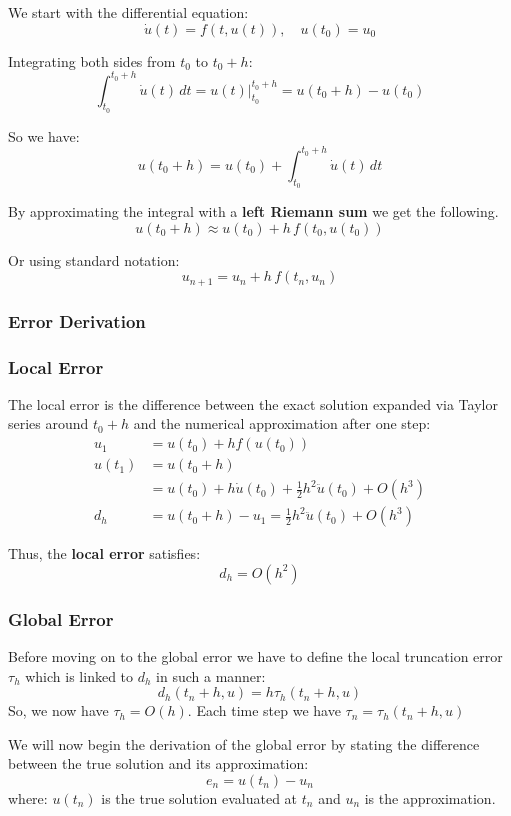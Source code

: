 \documentclass[11pt]{article}
\begin{document}
We start with the differential equation:
\[
\dot{u}(t) = f(t,u(t)) , \quad u(t_0) = u_0
\]

Integrating both sides from \( t_0 \) to \( t_0 + h \):
\[
\int_{t_0}^{t_0 + h} \dot{u}(t)\,dt = u(t) \bigg|_{t_0}^{t_0 + h} = u(t_0 + h) - u(t_0)
\]

So we have:
\[
u(t_0 + h) = u(t_0) + \int_{t_0}^{t_0 + h} \dot{u}(t)\,dt
\]

By approximating the integral with a \textbf{left Riemann sum} we get the following.
\[
u(t_0 + h) \approx u(t_0) + h\,f(t_0, u(t_0))
\]

Or using standard notation:
\[
u_{n+1} = u_n + h\,f(t_n,u_n)
\]

\subsubsection{Error Derivation}

\subsubsection*{Local Error}

The local error is the difference between the exact solution expanded via Taylor series around \( t_0 + h \) and the numerical approximation after one step:
\begin{align*}
u_1 &= u(t_0) + h f(u(t_0)) \\
u(t_1) &= u(t_0 + h) \\
       &= u(t_0) + h \dot u(t_0) + \frac{1}{2} h^2 \ddot u(t_0) + O(h^3) \\
d_h &= u(t_0 + h) - u_1 = \frac{1}{2} h^2 \ddot u(t_0) + O(h^3)
\end{align*}

Thus, the \textbf{local error} satisfies:
\[
d_h = O(h^2)
\]

\subsubsection*{Global Error}

Before moving on to the global error we have to define the local truncation error $\tau_h$ which is linked to $d_h$ in such a manner:
\[
d_h(t_n+h,u) = h \tau_h(t_n+h,u)
\]
So, we now have $\tau_h = O(h)$. Each time step we have $\tau_n = \tau_h(t_n+h,u)$

We will now begin the derivation of the global error by stating the difference between the true solution and its approximation:
\[
e_n = u(t_n) - u_n
\]
where: $u(t_n)$ is the true solution evaluated at $t_n$ and $u_n$ is the approximation.
\end{document}
